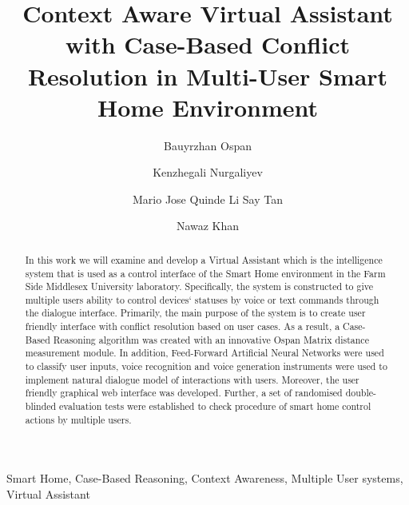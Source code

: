 \documentclass{llncs}
\begin{document}
    \title{Context Aware Virtual Assistant with
    Case-Based Conflict Resolution in
    Multi-User Smart Home Environment}
    \author{Bauyrzhan Ospan \and Kenzhegali Nurgaliyev \and Mario Jose Quinde Li Say Tan  \and Nawaz Khan }
    \maketitle
    \begin{abstract}
        In this work we will examine and develop a Virtual Assistant which is the intelligence system that is used as a control
        interface of the Smart Home environment in the Farm Side Middlesex University laboratory. Specifically, the system is
        constructed to give multiple users ability to control devices` statuses by voice or text commands through the dialogue
        interface. Primarily, the main purpose of the system is to create user friendly interface with conflict resolution based
        on user cases. As a result, a Case-Based Reasoning algorithm was created with an innovative Ospan Matrix distance
        measurement module. In addition, Feed-Forward Artificial Neural Networks were used to classify user inputs, voice
        recognition and voice generation instruments were used to implement natural dialogue model of interactions with users.
        Moreover, the user friendly graphical web interface was developed. Further, a set of randomised double-blinded
        evaluation tests were established to check procedure of smart home control actions by multiple users.
    \end{abstract}
    \begin{keywords}
        Smart Home, Case-Based Reasoning, Context Awareness, Multiple User systems, Virtual Assistant
    \end{keywords}
\end{document}

